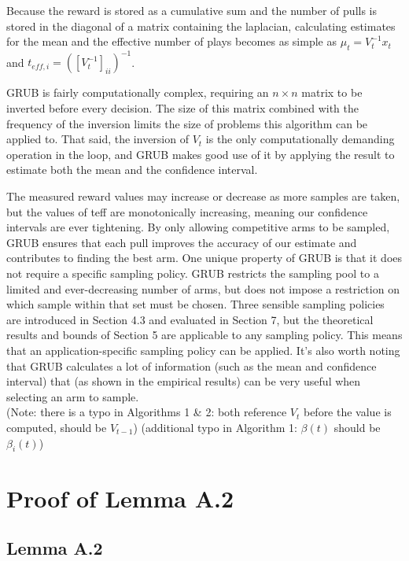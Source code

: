 \documentclass{article}[12pt]
\begin{document}
Because the reward is stored as a cumulative sum and the number of pulls is stored in the diagonal of a matrix containing the laplacian,
calculating estimates for the mean and the effective number of plays becomes as simple as $\mu_t = V_t^{-1} x_t$ and $t_{eff,i} = \left( \left[ V_t^{-1} \right]_{ii} \right)^{-1}$.

GRUB is fairly computationally complex, requiring an $n \times n$ matrix to be inverted before every decision.
The size of this matrix combined with the frequency of the inversion limits the size of problems this algorithm can be applied to.
That said, the inversion of $V_t$ is the only computationally demanding operation in the loop,
and GRUB makes good use of it by applying the result to estimate both the mean and the confidence interval.

The measured reward values may increase or decrease as more samples are taken, but the values of teff are monotonically increasing, meaning our confidence intervals are ever tightening.
By only allowing competitive arms to be sampled, GRUB ensures that each pull improves the accuracy of our estimate and contributes to finding the best arm.
One unique property of GRUB is that it does not require a specific sampling policy.
GRUB restricts the sampling pool to a limited and ever-decreasing number of arms, but does not impose a restriction on which sample within that set must be chosen.
Three sensible sampling policies are introduced in Section 4.3 and evaluated in Section 7, but the theoretical results and bounds of Section 5 are applicable to any sampling policy.
This means that an application-specific sampling policy can be applied.
It’s also worth noting that GRUB calculates a lot of information (such as the mean and confidence interval) that (as shown in the empirical results) can be very useful when selecting an arm to sample. \\

(Note: there is a typo in Algorithms 1 \& 2: both reference $V_t$ before the value is computed, should be $V_{t-1}$)
(additional typo in Algorithm 1:  $\beta(t)$ should be $\beta_i(t)$)

\section{Proof of Lemma A.2}

\subsection{Lemma A.2}
\end{document}
